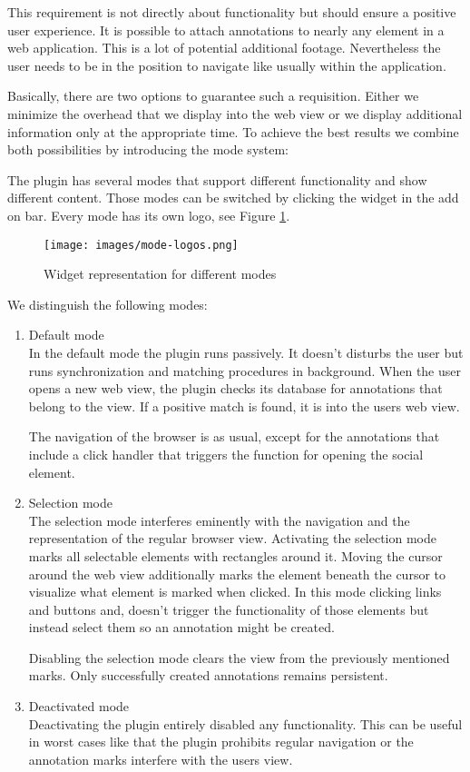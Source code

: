 This requirement is not directly about functionality but should ensure a positive user experience. It is possible to attach annotations to nearly any element in a web application. This is a lot of potential additional footage. Nevertheless the user needs to be in the position to navigate like usually within the application. 

Basically, there are two options to guarantee such a requisition. Either we minimize the overhead that we display into the web view or we display additional information only at the appropriate time. To achieve the best results we combine both possibilities by introducing the mode system:

The plugin has several modes that support different functionality and show different content. Those modes can be switched by clicking the widget in the add on bar. Every mode has its own logo, see Figure \ref{mode-logos}. 

\begin{figure}\centering
		\texttt{[image: images/mode-logos.png]}
		\caption{Widget representation for different modes}
		\label{mode-logos}
\end{figure} 

We distinguish the following modes:
\begin{enumerate}
\item Default mode \\

In the default mode the plugin runs passively. It doesn't disturbs the user but runs synchronization and matching procedures in background. When the user opens a new web view, the plugin checks its database for annotations that belong to the view. If a positive match is found, it is into the users web view. 

The navigation of the browser is as usual, except for the annotations that include a click handler that triggers the function for opening the social element.

\item Selection mode \\ 

The selection mode interferes eminently with the navigation and the representation of the regular browser view. Activating the selection mode marks all selectable elements with rectangles around it. Moving the cursor around the web view additionally marks the element beneath the cursor to visualize what element is marked when clicked. 
In this  mode clicking links and buttons and, doesn't trigger the functionality of those elements but instead select them so an annotation might be created. 

Disabling the selection mode clears the view from the previously mentioned marks. Only successfully created annotations remains persistent. 

\item Deactivated mode \\ 

Deactivating the plugin entirely disabled any functionality. This can be useful in worst cases like that the plugin prohibits regular navigation or the annotation marks interfere with the users view.
\end{enumerate}

